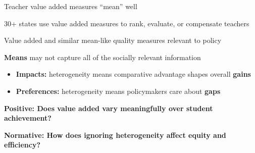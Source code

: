 \documentclass[t,aspectratio=169,11pt]{beamer}
\title{Are Value Added Measures Regressive? Evidence from Applying Welfare Theory \vskip.3cm}
\author{Tanner S Eastmond\footnote{Department of Economics, University of California San Diego} \vskip.2cm Nathan Mather$^2$ \vskip.2cm Michael Ricks\footnote{Department of Economics, University of Michigan} \vskip.2cm Julian Betts$^1$}
\date{}
\begin{document}

\begin{frame}
    \titlepage
\end{frame}

\setcounter{footnote}{0}







\begin{frame}{Teacher value added measures ``mean'' well}

    \vfill
    \begin{wideitemize}
        \item 30+ states use value added measures to rank, evaluate, or compensate teachers
        
        \item<2-> Value added and similar mean-like quality measures relevant to policy
        
        \item <3->{\textbf{Means}} may not capture all of the socially relevant information
            \begin{itemize}
                \item<4-> {\textbf{Impacts:}} heterogeneity means comparative advantage shapes overall {\textbf{gains}}
                \item<5-> {\textbf{Preferences:}} heterogeneity means policymakers care about {\textbf{gaps}}
            \end{itemize}
        
        \item<6-> {\textbf{Positive: Does value added vary meaningfully over student achievement?}} 
      
        \item<7> {\textbf{Normative: How does ignoring heterogeneity affect equity and efficiency?}}
    \end{wideitemize}
    \vfill
    
\end{frame}
\end{document}
